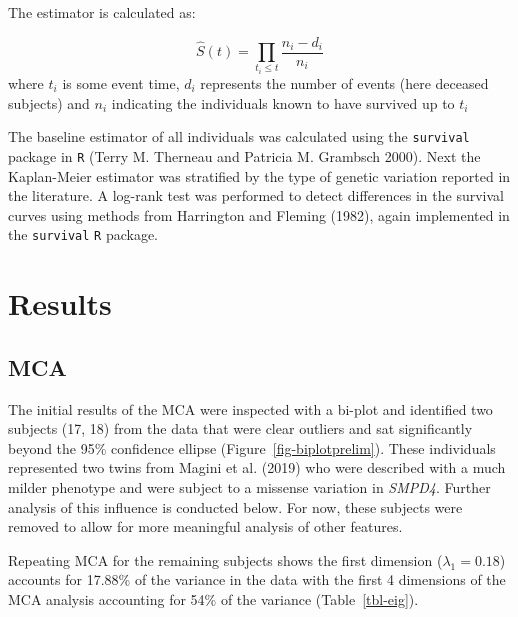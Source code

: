 \documentclass[
  letterpaper,
  DIV=11,
  numbers=noendperiod]{scrartcl}
\begin{document}
The estimator is calculated as:

\[
\hat{S}(t) = \prod_{t_i \leq t}\frac{n_i - d_i}{n_i} 
\] where \(t_i\) is some event time, \(d_i\) represents the number of
events (here deceased subjects) and \(n_i\) indicating the individuals
known to have survived up to \(t_i\)

The baseline estimator of all individuals was calculated using the
\texttt{survival} package in \texttt{R} (Terry M. Therneau and Patricia
M. Grambsch 2000). Next the Kaplan-Meier estimator was stratified by the
type of genetic variation reported in the literature. A log-rank test
was performed to detect differences in the survival curves using methods
from Harrington and Fleming (1982), again implemented in the
\texttt{survival} \texttt{R} package.

\hypertarget{results}{%
\section{Results}\label{results}}

\hypertarget{mca}{%
\subsection{MCA}\label{mca}}

The initial results of the MCA were inspected with a bi-plot and
identified two subjects (17, 18) from the data that were clear outliers
and sat significantly beyond the 95\% confidence ellipse
(Figure~\ref{fig-biplotprelim}). These individuals represented two twins
from Magini et al. (2019) who were described with a much milder
phenotype and were subject to a missense variation in \emph{SMPD4}.
Further analysis of this influence is conducted below. For now, these
subjects were removed to allow for more meaningful analysis of other
features.

Repeating MCA for the remaining subjects shows the first dimension
(\(\lambda_1 = 0.18\)) accounts for 17.88\% of the variance in the data
with the first 4 dimensions of the MCA analysis accounting for 54\% of
the variance (Table~\ref{tbl-eig}).
\end{document}
